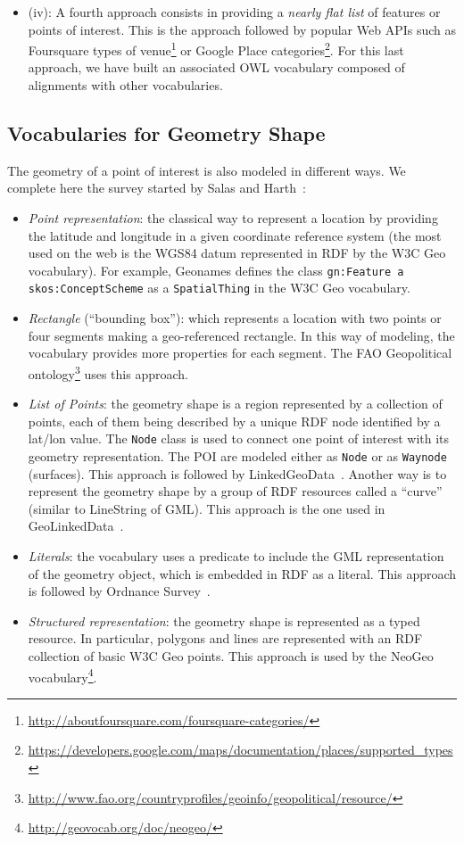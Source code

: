 \documentclass[a4paper,11pt]{report}
\begin{document}
\begin{itemize}
  \item (iv): A fourth approach consists in providing a \textit{nearly flat list} of features or points of interest. This is the approach followed by popular Web APIs such as Foursquare types of venue\footnote{\url{http://aboutfoursquare.com/foursquare-categories/}} or Google Place categories\footnote{\url{https://developers.google.com/maps/documentation/places/supported_types}}. For this last approach, we have built an associated OWL vocabulary composed of alignments with other vocabularies.
\end{itemize}

\subsection{Vocabularies for Geometry Shape}
The geometry of a point of interest is also modeled in different ways. We complete here the survey started by Salas and Harth~\cite{Salas2011}:
\begin{itemize}
  \item \textit{Point representation}: the classical way to represent a location by providing the latitude and longitude in a given coordinate reference system (the most used on the web is the WGS84 datum represented in RDF by the W3C Geo vocabulary). For example, Geonames defines the class \texttt{gn:Feature a skos:ConceptScheme} as a \texttt{SpatialThing} in the W3C Geo vocabulary.
  \item \textit{Rectangle} (``bounding box''): which represents a location with two points or four segments making a geo-referenced rectangle. In this way of modeling, the vocabulary provides more properties for each segment. The FAO Geopolitical ontology\footnote{\url{http://www.fao.org/countryprofiles/geoinfo/geopolitical/resource/}} uses this approach.
  \item \textit{List of Points}: the geometry shape is a region represented by a collection of points, each of them being described by a unique RDF node identified by a lat/lon value. The \texttt{Node} class is used to connect one point of interest with its geometry representation. The POI are modeled either as \texttt{Node} or as \texttt{Waynode} (surfaces). This approach is followed by LinkedGeoData~\cite{linkedgeodata}. Another way is to represent the geometry shape by a group of RDF resources called a ``curve'' (similar to LineString of GML). This approach is the one used in GeoLinkedData~\cite{deLeon2010}.
   \item \textit{Literals}: the vocabulary uses a predicate to include the GML representation of the geometry object, which is embedded in RDF as a literal. This approach is followed by Ordnance Survey~\cite{Goodwin2008}.
  \item \textit{Structured representation}: the geometry shape is represented as a typed resource. In particular, polygons and lines are represented with an RDF collection of basic W3C Geo points. This approach is used by the NeoGeo vocabulary\footnote{\url{http://geovocab.org/doc/neogeo/}}.
\end{itemize}
\end{document}
